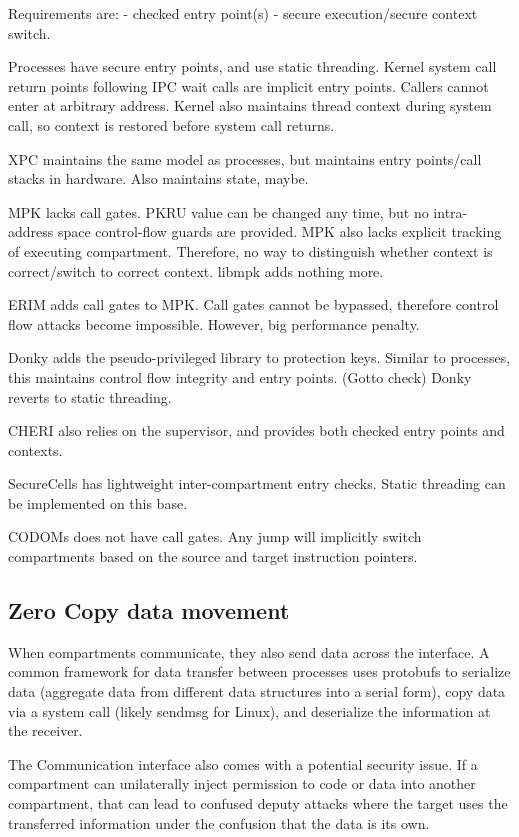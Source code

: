 Requirements are:
- checked entry point(s)
- secure execution/secure context switch.

Processes have secure entry points, and use static threading.
Kernel system call return points following IPC wait calls are implicit
entry points. 
Callers cannot enter at arbitrary address.
Kernel also maintains thread context during system call, so context is
restored before system call returns.

XPC maintains the same model as processes, but maintains entry points/call
stacks in hardware.
Also maintains state, maybe.

MPK lacks call gates. 
PKRU value can be changed any time, but no intra-address space control-flow
guards are provided.
MPK also lacks explicit tracking of executing compartment.
Therefore, no way to distinguish whether context is correct/switch to correct
context.
libmpk adds nothing more.

ERIM adds call gates to MPK.
Call gates cannot be bypassed, therefore control flow attacks become impossible.
However, big performance penalty.

Donky adds the pseudo-privileged library to protection keys.
Similar to processes, this maintains control flow integrity and entry points.
(Gotto check) Donky reverts to static threading.

CHERI also relies on the supervisor, and provides both checked entry points
and contexts.

SecureCells has lightweight inter-compartment entry checks.
Static threading can be implemented on this base.

CODOMs does not have call gates. 
Any jump will implicitly switch compartments based on the source and target
instruction pointers.

\subsection{Zero Copy data movement}

When compartments communicate, they also send data across the interface.
A common framework for data transfer between processes uses protobufs
to serialize data (aggregate data from different data structures into
a serial form), copy data via a system call (likely sendmsg for Linux),
and deserialize the information at the receiver.

The Communication interface also comes with a potential security
issue.
If a compartment can unilaterally inject permission to code or data
into another compartment, that can lead to confused deputy attacks where
the target uses the transferred information under the confusion that the
data is its own. 

